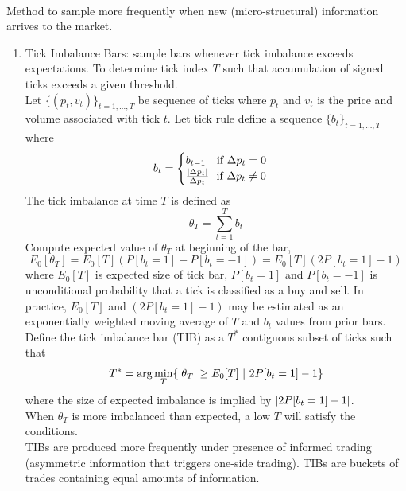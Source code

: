 \documentclass[a4paper,oneside,openany]{book}
\begin{document}
\begin{remark} \\
Method to sample more frequently when new (micro-structural) information arrives to the market.
\begin{enumerate}[label=\roman*.]
\setlength{\itemsep}{0pt}
\item Tick Imbalance Bars: sample bars whenever tick imbalance exceeds expectations. To determine tick index $T$ such that accumulation of signed ticks exceeds a given threshold.\\
Let $\{(p_t, v_t)\}_{t=1, \ldots, T}$ be sequence of ticks where $p_t$ and $v_t$ is the price and volume associated with tick $t$. Let tick rule define a sequence $\{b_t\}_{t=1, \ldots, T}$ where
\begin{align*}
b_t = 
\begin{cases}
b_{t-1} \ \ \ \text{if } \Delta p_t = 0 \\
\frac{\left\lvert\Delta p_t\right\rvert}{\Delta p_t} \ \ \text{if } \Delta p_t \neq 0
\end{cases} \nonumber
\end{align*}
The tick imbalance at time $T$ is defined as 
\begin{equation*}
\theta_T = \sum\limits_{t=1}^T b_t \nonumber
\end{equation*}
Compute expected value of $\theta_T$ at beginning of the bar,
\begin{equation*}
E_0[\theta_T] = E_0 [T](P[b_t = 1] - P[b_t = -1]) = E_0 [T](2P[b_t = 1] - 1) \nonumber
\end{equation*}
where $E_0[T]$ is expected size of tick bar, $P[b_t = 1]$ and $P[b_t = -1]$ is unconditional probability that a tick is classified as a buy and sell. In practice, $E_0[T]$ and $(2P[b_t = 1] - 1)$ may be estimated as an exponentially weighted moving average of $T$ and $b_t$ values from prior bars.\\
Define the tick imbalance bar (TIB) as a $T^{*}$ contiguous subset of ticks such that
\begin{equation*}
T^{*} = \arg \min_T \{ \left\lvert\theta_T\right\rvert \geq E_0 [T] \ \vert \ 2 P[b_t = 1] - 1 \} \nonumber
\end{equation*}
where the size of expected imbalance is implied by $\left\lvert2 P[b_t = 1] - 1\right\rvert$.\\
When $\theta_T$ is more imbalanced than expected, a low $T$ will satisfy the conditions.\\
TIBs are produced more frequently under presence of informed trading (asymmetric information that triggers one-side trading). TIBs are buckets of trades containing equal amounts of information.

\end{enumerate}
\end{remark}
\end{document}
